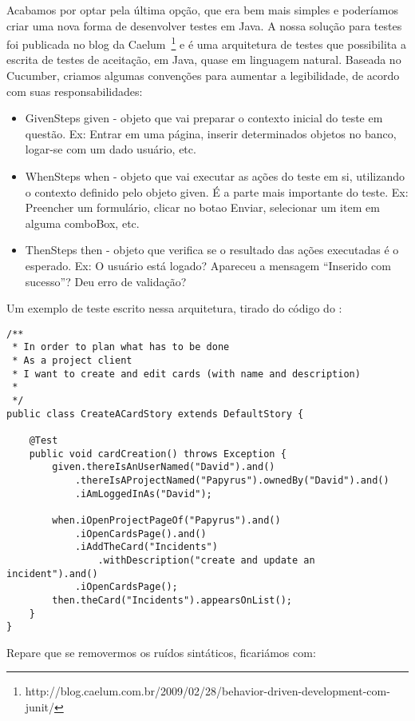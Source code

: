 Acabamos por optar pela última opção, que era bem mais simples e poderíamos criar uma nova forma de desenvolver 
testes em Java. A nossa solução para testes foi publicada no blog da
Caelum~\footnote{http://blog.caelum.com.br/2009/02/28/behavior-driven-development-com-junit/} e é uma arquitetura de 
testes que possibilita a escrita de testes de aceitação, em Java, quase em linguagem natural. Baseada no Cucumber, criamos 
algumas convenções para aumentar a legibilidade, de acordo com suas responsabilidades:

\begin{itemize}
	\item{GivenSteps given - objeto que vai preparar o contexto inicial do teste em questão. Ex: Entrar em uma página, 
	inserir determinados objetos no banco, logar-se com um dado usuário, etc.}
	\item{WhenSteps when - objeto que vai executar as ações do teste em si, utilizando o contexto definido pelo objeto given. 
	É a parte mais importante do teste. Ex: Preencher um formulário, clicar no botao Enviar, selecionar um item em alguma 
	comboBox, etc.}
	\item{ThenSteps then - objeto que verifica se o resultado das ações executadas é o esperado. Ex: O usuário está logado? 
	Apareceu a mensagem ``Inserido com sucesso''? Deu erro de validação?}
\end{itemize}

Um exemplo de teste escrito nessa arquitetura, tirado do código do \calopsita:

\begin{lstlisting}
/**
 * In order to plan what has to be done
 * As a project client
 * I want to create and edit cards (with name and description)
 *
 */
public class CreateACardStory extends DefaultStory {

	@Test
	public void cardCreation() throws Exception {
		given.thereIsAnUserNamed("David").and()
			.thereIsAProjectNamed("Papyrus").ownedBy("David").and()
			.iAmLoggedInAs("David");

		when.iOpenProjectPageOf("Papyrus").and()
		    .iOpenCardsPage().and()
			.iAddTheCard("Incidents")
				.withDescription("create and update an incident").and()
			.iOpenCardsPage();
		then.theCard("Incidents").appearsOnList();
	}
}
\end{lstlisting}

Repare que se removermos os ruídos sintáticos, ficariámos com:

